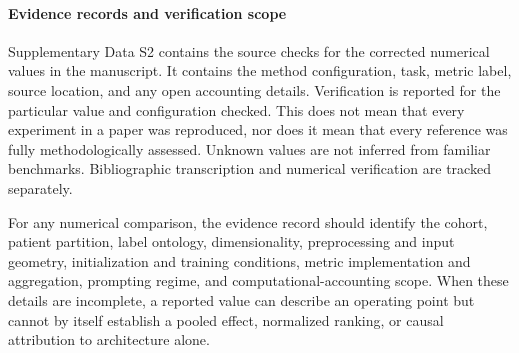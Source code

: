 \documentclass[5p,times,authoryear]{elsarticle}
\begin{document}
\paragraph{Evidence records and verification scope}
Supplementary Data S2 contains the source checks for the corrected numerical values in the manuscript. It contains the method configuration, task, metric label, source location, and any open accounting details. Verification is reported for the particular value and configuration checked. This does not mean that every experiment in a paper was reproduced, nor does it mean that every reference was fully methodologically assessed. Unknown values are not inferred from familiar benchmarks. Bibliographic transcription and numerical verification are tracked separately.

For any numerical comparison, the evidence record should identify the cohort, patient partition, label ontology, dimensionality, preprocessing and input geometry, initialization and training conditions, metric implementation and aggregation, prompting regime, and computational-accounting scope. When these details are incomplete, a reported value can describe an operating point but cannot by itself establish a pooled effect, normalized ranking, or causal attribution to architecture alone.
\end{document}
